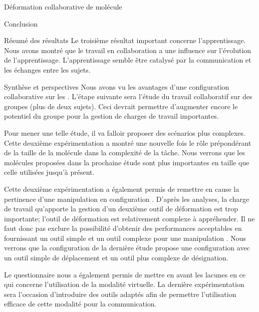 \documentclass[myfrancais,ngerman,english,french]{mythesis}
\begin{document}
\begin{mychapter}{Déformation collaborative de molécule}
\begin{mysection}{Conclusion}
\begin{mysubsection}{Résumé des résultats}
				Le troisième résultat important concerne l'apprentissage.
				Nous avons montré que le travail en collaboration a une influence sur l'évolution de l'apprentissage.
				L'apprentissage semble être catalysé par la communication et les échanges entre les sujets.
			\end{mysubsection}
			\begin{mysubsection}{Synthèse et perspectives}
				Nous avons vu les avantages d'une configuration collaborative sur les .
				L'étape suivante sera l'étude du travail collaboratif sur des groupes (plus de deux sujets).
				Ceci devrait permettre d'augmenter encore le potentiel du groupe pour la gestion de charges de travail importantes.

				Pour mener une telle étude, il va falloir proposer des scénarios plus complexes.
				Cette deuxième expérimentation a montré une nouvelle fois le rôle prépondérant de la taille de la molécule dans la complexité de la tâche.
				Nous verrons que les molécules proposées dans la prochaine étude sont plus importantes en taille que celle utilisées jusqu'à présent.

				Cette deuxième expérimentation a également permis de remettre en cause la pertinence d'une manipulation en configuration .
				D'après les analyses, la charge de travail qu'apporte la gestion d'un deuxième outil de déformation est trop importante; l'outil de déformation est relativement complexe à appréhender.
				Il ne faut donc pas exclure la possibilité d'obtenir des performances acceptables en fournissant un outil simple et un outil complexe pour une manipulation .
				Nous verrons que la configuration de la dernière étude  propose une configuration  avec un outil simple de déplacement et un outil plus complexe de désignation.

				Le questionnaire nous a également permis de mettre en avant les lacunes en ce qui concerne l'utilisation de la modalité virtuelle.
				La dernière expérimentation sera l'occasion d'introduire des outils adaptés afin de permettre l'utilisation efficace de cette modalité pour la communication.
			\end{mysubsection}
		\end{mysection}
	\end{mychapter}
\end{document}
